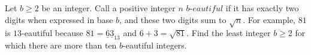 Let $b \geq 2$ be an integer. Call a positive integer $n$ $b\textit{-eautiful}$ if it has exactly two digits when expressed in base $b$, and these two digits sum to $\sqrt{n}$. For example, $81$ is $13$-eautiful because $81=\underline{6}$$\underline{3}_{13}$ and $6+3=\sqrt{81}$. Find the least integer $b\geq 2$ for which there are more than ten $b$-eautiful integers. 
